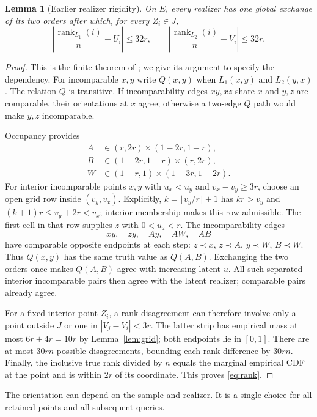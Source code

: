 \documentclass[11pt]{article}
\newtheorem{lemma}[theorem]{Lemma}
\theoremstyle{remark}
\newcommand{\rank}{\operatorname{rank}}
\begin{document}
\begin{lemma}[Earlier realizer rigidity]\label{lem:rank}
On $E$, every realizer has one global exchange of its two orders
after which, for every $Z_i\in J$,
\begin{equation}\label{eq:rank}
 \left|\frac{\rank_{L_1}(i)}n-U_i\right|\le32r,\qquad
 \left|\frac{\rank_{L_2}(i)}n-V_i\right|\le32r.
\end{equation}
\end{lemma}
\begin{proof}
This is the finite theorem of \cite{Reconstruction}; we give its
argument to specify the dependency. For incomparable $x,y$ write
$Q(x,y)$ when $L_1(x,y)$ and $L_2(y,x)$. The relation $Q$ is
transitive. If incomparability edges $xy,xz$ share $x$ and $y,z$
are comparable, their orientations at $x$ agree; otherwise a
two-edge $Q$ path would make $y,z$ incomparable.

Occupancy provides
\begin{align*}
 A&\in(r,2r)\times(1-2r,1-r),\\
 B&\in(1-2r,1-r)\times(r,2r),\\
 W&\in(1-r,1)\times(1-3r,1-2r).
\end{align*}
For interior incomparable points $x,y$ with $u_x<u_y$ and
$v_x-v_y\ge3r$, choose an open grid row inside $(v_y,v_x)$.
Explicitly, $k=\lfloor v_y/r\rfloor+1$ has $kr>v_y$ and
$(k+1)r\le v_y+2r<v_x$; interior membership makes this row admissible.
The first cell in that row supplies $z$ with $0<u_z<r$.
The incomparability edges
\[
 xy,\quad zy,\quad Ay,\quad AW,\quad AB
\]
have comparable opposite endpoints at each step:
$z\prec x$, $z\prec A$, $y\prec W$, $B\prec W$.
Thus $Q(x,y)$ has the same truth value as $Q(A,B)$.
Exchanging the two orders once makes $Q(A,B)$ agree with increasing
latent $u$. All such separated interior incomparable pairs then
agree with the latent realizer; comparable pairs already agree.

For a fixed interior point $Z_i$, a rank disagreement can therefore
involve only a point outside $J$ or one in $|V_j-V_i|<3r$.
The latter strip has empirical mass at most
$6r+4r=10r$ by Lemma~\ref{lem:grid}; both endpoints lie in $[0,1]$.
There are at most $30rn$ possible disagreements, bounding each
rank difference by $30rn$. Finally, the inclusive true rank divided
by $n$ equals the marginal empirical CDF at the point and is within
$2r$ of its coordinate. This proves \eqref{eq:rank}.
\end{proof}
The orientation can depend on the sample and realizer. It is a single
choice for all retained points and all subsequent queries.
\end{document}
